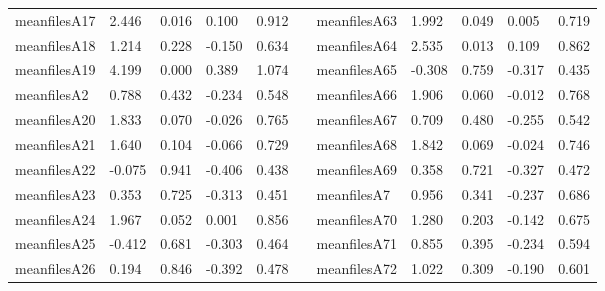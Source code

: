 \begin{table}[h!]
\begin{tabular}{lllllllllll}
meanfilesA17  & 2.446            & 0.016            & 0.100            & 0.912            &           & meanfilesA63  & 1.992            & 0.049            & 0.005            & 0.719            \\
meanfilesA18  & 1.214            & 0.228            & -0.150           & 0.634            &           & meanfilesA64  & 2.535            & 0.013            & 0.109            & 0.862            \\
meanfilesA19  & 4.199            & 0.000            & 0.389            & 1.074            &           & meanfilesA65  & -0.308           & 0.759            & -0.317           & 0.435            \\
meanfilesA2   & 0.788            & 0.432            & -0.234           & 0.548            &           & meanfilesA66  & 1.906            & 0.060            & -0.012           & 0.768            \\
meanfilesA20  & 1.833            & 0.070            & -0.026           & 0.765            &           & meanfilesA67  & 0.709            & 0.480            & -0.255           & 0.542            \\
meanfilesA21  & 1.640            & 0.104            & -0.066           & 0.729            &           & meanfilesA68  & 1.842            & 0.069            & -0.024           & 0.746            \\
meanfilesA22  & -0.075           & 0.941            & -0.406           & 0.438            &           & meanfilesA69  & 0.358            & 0.721            & -0.327           & 0.472            \\
meanfilesA23  & 0.353            & 0.725            & -0.313           & 0.451            &           & meanfilesA7   & 0.956            & 0.341            & -0.237           & 0.686            \\
meanfilesA24  & 1.967            & 0.052            & 0.001            & 0.856            &           & meanfilesA70  & 1.280            & 0.203            & -0.142           & 0.675            \\
meanfilesA25  & -0.412           & 0.681            & -0.303           & 0.464            &           & meanfilesA71  & 0.855            & 0.395            & -0.234           & 0.594            \\
meanfilesA26  & 0.194            & 0.846            & -0.392           & 0.478            &           & meanfilesA72  & 1.022            & 0.309            & -0.190           & 0.601            \\

\end{tabular}
\end{table}
